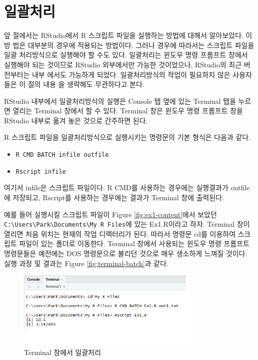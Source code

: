 \documentclass[
]{book}
\begin{document}
\hypertarget{section-batch}{%
\section{일괄처리}\label{section-batch}}

앞 절에서는 RStudio에서 R 스크립트 파일을 실행하는 방법에 대해서
알아보았다. 이 방 법은 대부분의 경우에 적용되는 방법이다. 그러나 경우에
따라서는 스크립트 파일을 일괄 처리방식으로 실행해야 할 수도 있다.
일괄처리는 윈도우 명령 프롬프트 창에서 실행해야 되는 것이므로 RStudio
외부에서만 가능한 것이었으나, RStudio의 최근 버전부터는 내부 에서도
가능하게 되었다. 일괄처리방식의 작업이 필요하지 않은 사용자들은 이 절의
내용 을 생략해도 무관하다고 본다.

RStudio 내부에서 일괄처리방식의 실행은 Console 탭 옆에 있는 Terminal
탭을 누르면 열리는 Terminal 창에서 할 수 있다. Terminal 창은 윈도우 명령
프롬프트 창을 RStudio 내부로 옮겨 놓은 것으로 간주하면 된다.

R 스크립트 파일을 일괄처리방식으로 실행시키는 명령문의 기본 형식은
다음과 같다.

\begin{itemize}
\item
  \texttt{R\ CMD\ BATCH\ infile\ outfile}
\item
  \texttt{Rscript\ infile}
\end{itemize}

여기서 infile은 스크립트 파일이다. R CMD를 사용하는 경우에는 실행결과가
outfile에 저장되고, Rscript를 사용하는 경우에는 결과가 Terminal 창에
출력된다.

예를 들어 실행시킬 스크립트 파일이 Figure \ref{fig:ex1-content}에서
보았던 \texttt{C:\textbackslash{}Users\textbackslash{}Park\textbackslash{}Documents\textbackslash{}My\ R\ Files}에 있는 Ex1.R이라고 하자.
Terminal 창이 열리면 처음 위치는 현재의 작업 디렉터리가 된다. 따라서
명령문 cd를 이용하여 스크립트 파일이 있는 폴더로 이동한다. Terminal
창에서 사용되는 윈도우 명령 프롬프트 명령문들은 예전에는 DOS 명령문으로
불리던 것으로 매우 생소하게 느껴질 것이다. 실행 과정 및 결과는 Figure
\ref{fig:terminal-batch}과 같다.

\begin{figure}
\hypertarget{terminal-batch}{%
\centering
\includegraphics[width=3.47917in,height=\textheight]{Figure/terminal_batch.png}
\caption{Terminal 창에서
일괄처리}\label{terminal-batch}
}
\end{figure}
\end{document}
